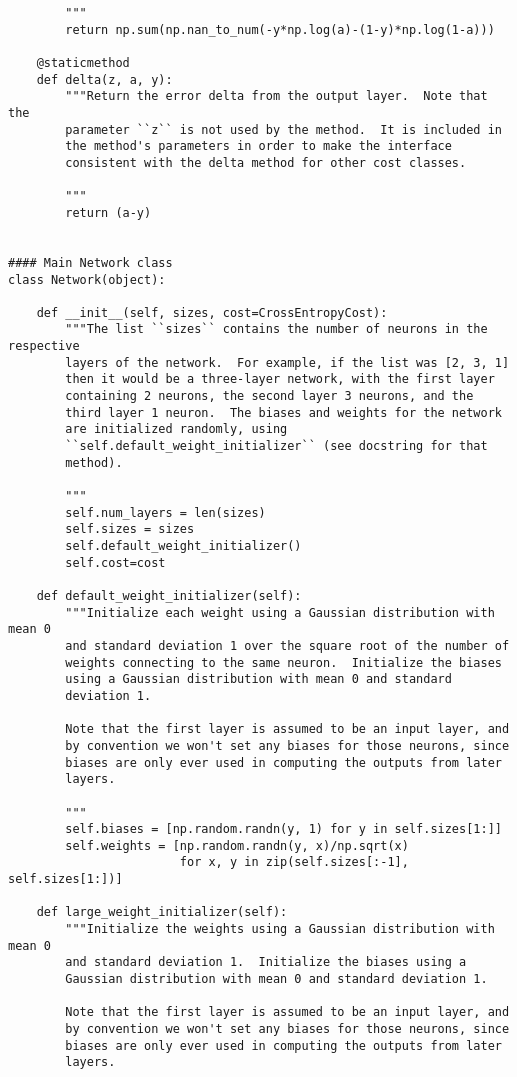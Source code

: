\begin{lstlisting}
        """
        return np.sum(np.nan_to_num(-y*np.log(a)-(1-y)*np.log(1-a)))

    @staticmethod
    def delta(z, a, y):
        """Return the error delta from the output layer.  Note that the
        parameter ``z`` is not used by the method.  It is included in
        the method's parameters in order to make the interface
        consistent with the delta method for other cost classes.

        """
        return (a-y)


#### Main Network class
class Network(object):

    def __init__(self, sizes, cost=CrossEntropyCost):
        """The list ``sizes`` contains the number of neurons in the respective
        layers of the network.  For example, if the list was [2, 3, 1]
        then it would be a three-layer network, with the first layer
        containing 2 neurons, the second layer 3 neurons, and the
        third layer 1 neuron.  The biases and weights for the network
        are initialized randomly, using
        ``self.default_weight_initializer`` (see docstring for that
        method).

        """
        self.num_layers = len(sizes)
        self.sizes = sizes
        self.default_weight_initializer()
        self.cost=cost

    def default_weight_initializer(self):
        """Initialize each weight using a Gaussian distribution with mean 0
        and standard deviation 1 over the square root of the number of
        weights connecting to the same neuron.  Initialize the biases
        using a Gaussian distribution with mean 0 and standard
        deviation 1.

        Note that the first layer is assumed to be an input layer, and
        by convention we won't set any biases for those neurons, since
        biases are only ever used in computing the outputs from later
        layers.

        """
        self.biases = [np.random.randn(y, 1) for y in self.sizes[1:]]
        self.weights = [np.random.randn(y, x)/np.sqrt(x)
                        for x, y in zip(self.sizes[:-1], self.sizes[1:])]

    def large_weight_initializer(self):
        """Initialize the weights using a Gaussian distribution with mean 0
        and standard deviation 1.  Initialize the biases using a
        Gaussian distribution with mean 0 and standard deviation 1.

        Note that the first layer is assumed to be an input layer, and
        by convention we won't set any biases for those neurons, since
        biases are only ever used in computing the outputs from later
        layers.


\end{lstlisting}
